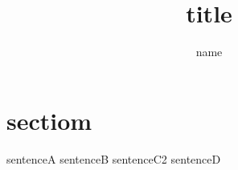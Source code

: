 \documentclass{jarticle}
\title{title}
\author{name}
\begin{document}
\maketitle
\section{sectiom}
sentenceA
sentenceB
sentenceC2
sentenceD
\end{document}
